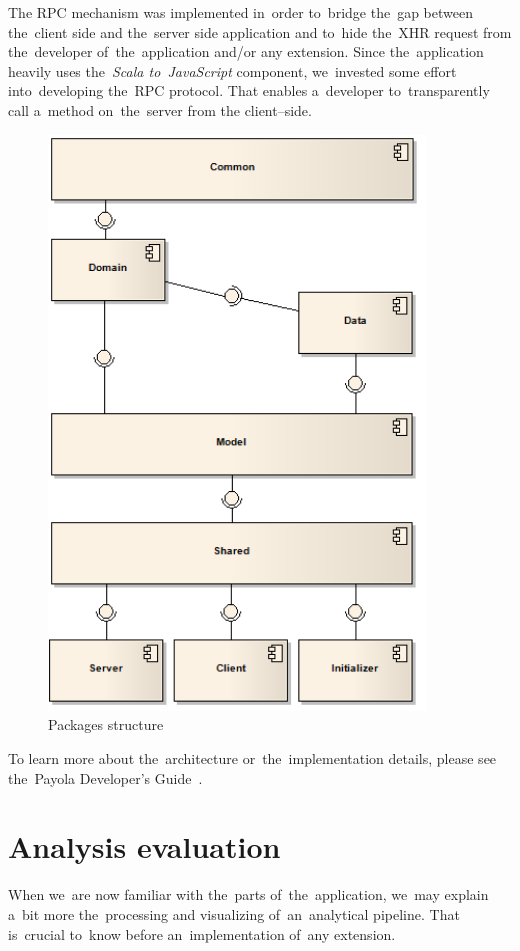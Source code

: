 The RPC mechanism was implemented in~order to~bridge the~gap between the~client 
side and the~server side application and to~hide the~XHR request from
the~developer of~the~application and/or any extension. Since the~application heavily
uses the~\emph{Scala to~JavaScript} component, we~invested some effort into~developing the~RPC 
protocol. That enables a~developer to~transparently call a~method on~the~server from 
the client--side. 

\begin{figure}
	\centering
	\includegraphics[width=100mm]{images/project_dependencies.png}
	\caption{Packages structure}
	\label{fig:packages-structure}
\end{figure}

To learn more about the~architecture or~the~implementation details, please see the~Payola Developer's Guide~\cite{payola:dg}.

\section{Analysis evaluation}
When we~are now familiar with the~parts of~the~application, we~may explain a~bit more the~processing and visualizing of~an~analytical pipeline. That is~crucial to~know before an~implementation of~any extension.

